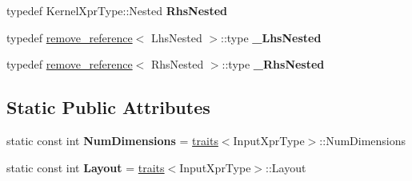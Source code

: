 \begin{DoxyCompactItemize}
typedef Kernel\+Xpr\+Type\+::\+Nested {\bfseries Rhs\+Nested}
\item 
\mbox{\label{struct_eigen_1_1internal_1_1traits_3_01_tensor_convolution_op_3_01_dimensions_00_01_input_xpr_tyede4d3ebe1b8839795edc93275eed3f9_a09b443f14f500af5320f70ce07b64687}} 
typedef \hyperlink{struct_eigen_1_1internal_1_1remove__reference}{remove\+\_\+reference}$<$ Lhs\+Nested $>$\+::type {\bfseries \+\_\+\+Lhs\+Nested}
\item 
\mbox{\label{struct_eigen_1_1internal_1_1traits_3_01_tensor_convolution_op_3_01_dimensions_00_01_input_xpr_tyede4d3ebe1b8839795edc93275eed3f9_a6968b982801682da49cb1435451027d4}} 
typedef \hyperlink{struct_eigen_1_1internal_1_1remove__reference}{remove\+\_\+reference}$<$ Rhs\+Nested $>$\+::type {\bfseries \+\_\+\+Rhs\+Nested}
\end{DoxyCompactItemize}
\subsection*{Static Public Attributes}
\begin{DoxyCompactItemize}
\item 
\mbox{\label{struct_eigen_1_1internal_1_1traits_3_01_tensor_convolution_op_3_01_dimensions_00_01_input_xpr_tyede4d3ebe1b8839795edc93275eed3f9_ad3c6195db7defd9233be2914a988f0f8}} 
static const int {\bfseries Num\+Dimensions} = \hyperlink{struct_eigen_1_1internal_1_1traits}{traits}$<$Input\+Xpr\+Type$>$\+::Num\+Dimensions
\item 
\mbox{\label{struct_eigen_1_1internal_1_1traits_3_01_tensor_convolution_op_3_01_dimensions_00_01_input_xpr_tyede4d3ebe1b8839795edc93275eed3f9_a2f6d5bbb8373bc4ce71bd8e7b0ffae4c}} 
static const int {\bfseries Layout} = \hyperlink{struct_eigen_1_1internal_1_1traits}{traits}$<$Input\+Xpr\+Type$>$\+::Layout
\end{DoxyCompactItemize}


